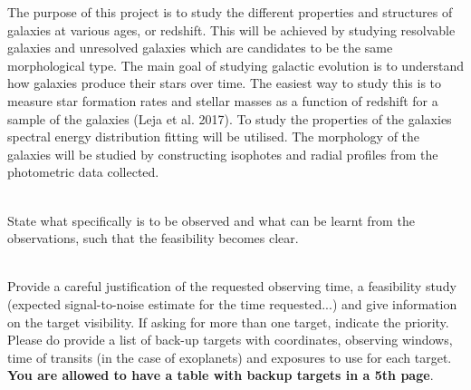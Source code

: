 \documentclass[11pt]{article}
\begin{document}
The purpose of this project is to study the different properties and structures of galaxies at various ages, or
redshift. This will be achieved by studying resolvable galaxies and unresolved galaxies which are candidates to
be the same morphological type. The main goal of studying galactic evolution is to understand how galaxies
produce their stars over time. The easiest way to study this is to measure star formation rates and stellar
masses as a function of redshift for a sample of the galaxies (Leja et al. 2017). To study the properties of the
galaxies spectral energy distribution fitting will be utilised. The morphology of the galaxies will be studied by
constructing isophotes and radial profiles from the photometric data collected.

\begin{figure}[h]
\begin{center}
%
\end{center}
\caption{\footnotesize{
}}
\label{somethhihng}
\end{figure}

\smallskip
{}
\smallskip\\
State what specifically is to be observed and what can be learnt 
from the observations, such that the feasibility becomes clear.

%
%
% 
%
\smallskip
{}
\smallskip\\
Provide a careful justification of the requested observing time, a feasibility study (expected signal-to-noise estimate for the time requested...) and give information on the target visibility.
If asking for more than one target, indicate the priority.
Please do provide a list of back-up targets with coordinates, observing windows, time of transits (in the case of exoplanets) and exposures to use for each target. \textbf{You are allowed to have a table with backup targets in a 5th page}.
\end{document}
